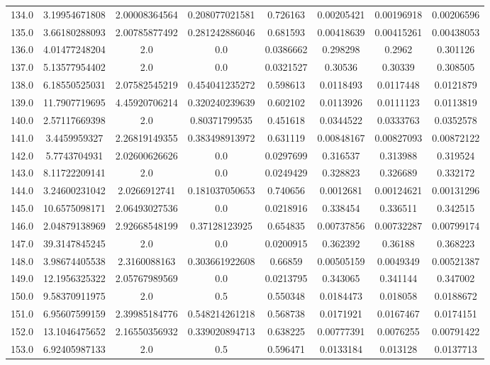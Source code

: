 \begin{longtable}{|c|c|c|c|c|c|c|c|}
134.0 & 3.19954671808 & 2.00008364564 & 0.208077021581 & 0.726163 & 0.00205421 & 0.00196918 & 0.00206596 \\
135.0 & 3.66180288093 & 2.00785877492 & 0.281242886046 & 0.681593 & 0.00418639 & 0.00415261 & 0.00438053 \\
136.0 & 4.01477248204 & 2.0 & 0.0 & 0.0386662 & 0.298298 & 0.2962 & 0.301126 \\
137.0 & 5.13577954402 & 2.0 & 0.0 & 0.0321527 & 0.30536 & 0.30339 & 0.308505 \\
138.0 & 6.18550525031 & 2.07582545219 & 0.454041235272 & 0.598613 & 0.0118493 & 0.0117448 & 0.0121879 \\
139.0 & 11.7907719695 & 4.45920706214 & 0.320240239639 & 0.602102 & 0.0113926 & 0.0111123 & 0.0113819 \\
140.0 & 2.57117669398 & 2.0 & 0.80371799535 & 0.451618 & 0.0344522 & 0.0333763 & 0.0352578 \\
141.0 & 3.4459959327 & 2.26819149355 & 0.383498913972 & 0.631119 & 0.00848167 & 0.00827093 & 0.00872122 \\
142.0 & 5.7743704931 & 2.02600626626 & 0.0 & 0.0297699 & 0.316537 & 0.313988 & 0.319524 \\
143.0 & 8.11722209141 & 2.0 & 0.0 & 0.0249429 & 0.328823 & 0.326689 & 0.332172 \\
144.0 & 3.24600231042 & 2.0266912741 & 0.181037050653 & 0.740656 & 0.0012681 & 0.00124621 & 0.00131296 \\
145.0 & 10.6575098171 & 2.06493027536 & 0.0 & 0.0218916 & 0.338454 & 0.336511 & 0.342515 \\
146.0 & 2.04879138969 & 2.92668548199 & 0.37128123925 & 0.654835 & 0.00737856 & 0.00732287 & 0.00799174 \\
147.0 & 39.3147845245 & 2.0 & 0.0 & 0.0200915 & 0.362392 & 0.36188 & 0.368223 \\
148.0 & 3.98674405538 & 2.3160088163 & 0.303661922608 & 0.66859 & 0.00505159 & 0.0049349 & 0.00521387 \\
149.0 & 12.1956325322 & 2.05767989569 & 0.0 & 0.0213795 & 0.343065 & 0.341144 & 0.347002 \\
150.0 & 9.58370911975 & 2.0 & 0.5 & 0.550348 & 0.0184473 & 0.018058 & 0.0188672 \\
151.0 & 6.95607599159 & 2.39985184776 & 0.548214261218 & 0.568738 & 0.0171921 & 0.0167467 & 0.0174151 \\
152.0 & 13.1046475652 & 2.16550356932 & 0.339020894713 & 0.638225 & 0.00777391 & 0.0076255 & 0.00791422 \\
153.0 & 6.92405987133 & 2.0 & 0.5 & 0.596471 & 0.0133184 & 0.013128 & 0.0137713 \\

\end{longtable}
